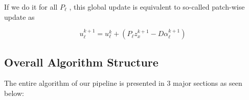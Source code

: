 \documentclass{article}
\theoremstyle{definition}
\begin{document}
If we do it for all $P_\ell$
, this global update is equivalent to so-called patch-wise update as 

$$
u_{\ell}^{k+1}=u_{\ell}^k+\left(P_{\ell} z_x^{k+1}-D \alpha_{\ell}^{k+1}\right)
$$









\subsection{Overall Algorithm Structure}

The entire algorithm of our pipeline is presented in 3 major sections as seen below:

\newpage

\end{document}
